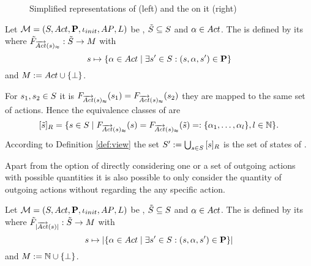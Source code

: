 \documentclass[preview]{standalone}
\begin{document}
\begin{figure}[h]
	\begin{minipage}{.5\textwidth}
		\hspace{5mm}
		
	\end{minipage}%
	\begin{minipage}{.5\textwidth}				
		\hspace{5mm}
		
	\end{minipage}	
	\caption{Simplified representations of \mdp (left) and the \viewN \viewweakoutactident on it (right)}	
	\label{fig:outActIdentWeakAfter}  	
\end{figure}


\begin{definition}
	Let ${{{\mathcal{M}}}} = {{({S}, {Act}, {\textbf{P}}, {\iota_{init}}, {AP}, {L})}}$ be \achgphN, ${\tilde{{S}}} \subseteq {S}$ and ${\alpha} \in {Act}$. The \viewN \viewweakoutactident is defined by its \grpfctN where ${{\tilde{F}_{{{\overrightarrow{{Act}}}({s})_\approx}}}} : {\tilde{{S}}} \to {\ensuremath{{M}}}$ with
	\[
	{s} \mapsto \{{\alpha} \in {Act} \mid \exists {s}' \in {S} : ({s}, {\alpha}, {s}') \in {\ensuremath{{\textbf{P}}}}\} 	
	\]
	and ${{M}} := {Act} \cup {\{\bot\}}$.
\end{definition}


For ${s}_1, {s}_2 \in {S}$ it is ${{F_{{{\overrightarrow{{Act}}}({s})_\approx}}}}({s}_1) = {{F_{{{\overrightarrow{{Act}}}({s})_\approx}}}}({s}_2)$ \iffN they are mapped to the same set of actions. Hence the equivalence classes of \eqrelview are
\[
	{{[{\tilde{{s}}}]_{{R}}}} = \{ {s} \in {S} \mid {\ensuremath{{F_{{{\overrightarrow{{Act}}}({s})_\approx}}}}}({s}) = {{F_{{{\overrightarrow{{Act}}}({s})_\approx}}}}({\tilde{{s}}}) =: \{{\alpha}_1, \dots, {\alpha}_l\}, l \in {\mathbb{N}}\}.
\]
According to Definition \ref{def:view} the set ${S}' := \bigcup_{{s} \in {S}} {{[{s}]_{{R}}}}$ is the set of states of \viewweakoutactident.

Apart from the option of directly considering one or a set of outgoing actions with possible quantities it is also possible to only consider the quantity of outgoing actions without regarding the any specific action.

\begin{definition}
	Let ${{{\mathcal{M}}}} = {{({S}, {Act}, {\textbf{P}}, {\iota_{init}}, {AP}, {L})}}$ be \achgphN, ${\tilde{{S}}} \subseteq {S}$ and ${\alpha} \in {Act}$. The \viewN \viewoutactsetsize is defined by its \grpfctN where ${{\tilde{F}_{{|{\overrightarrow{{Act}}}({s})|}}}} : {\tilde{{S}}} \to {\ensuremath{{M}}}$ with
	\[
	{s} \mapsto |\{{\alpha} \in {Act} \mid \exists {s}' \in {S} : ({s}, {\alpha}, {s}') \in {\ensuremath{{\textbf{P}}}}\}|
	\]
	and ${{M}} := {\mathbb{N}} \cup {\{\bot\}}$.
\end{definition}
\end{document}
